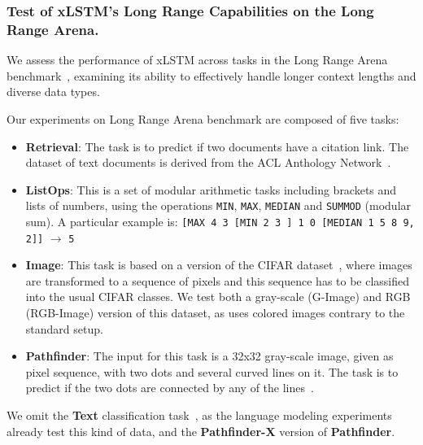 \documentclass[dvipsnames]{article}
\begin{document}
\begin{appendix}
\newpage

\subsubsection{Test of xLSTM's Long Range Capabilities on the Long Range Arena.}\label{sec:appExpSynthetic-lra}
We assess the performance of xLSTM across tasks in the Long Range Arena
benchmark~\citep{Tay:21}, examining its ability to effectively handle
longer context lengths and diverse data types.

Our experiments on Long Range Arena benchmark are composed of five tasks:
\begin{itemize}
\item \textbf{Retrieval}: The task is to predict if two documents have a citation link. 
The dataset of text documents is derived from the ACL Anthology Network~\citep{Radev:09}.
\item \textbf{ListOps}: This is a set of modular arithmetic tasks including brackets and lists of numbers, using the operations \texttt{MIN}, \texttt{MAX}, \texttt{MEDIAN} and \texttt{SUMMOD} (modular sum).
A particular example is: \texttt{[MAX 4 3 [MIN 2 3 ] 1 0 [MEDIAN 1 5 8 9, 2]]} $\xrightarrow{}$ \texttt{5}
\item \textbf{Image}: This task is based on a version of the CIFAR dataset~\citep{Krizhevsky:09}, 
where images are transformed to a sequence of pixels and this sequence has to be classified into the usual CIFAR classes. 
We test both a gray-scale (G-Image) and RGB (RGB-Image) version of this dataset, 
as \citet{Orvieto:23} uses colored images contrary to the standard setup.
\item \textbf{Pathfinder}: The input for this task is a 32x32 gray-scale image, given as pixel sequence,
with two dots and several curved lines on it. 
The task is to predict if the two dots are connected by any of the lines~\citep{Linsley:18}.
\end{itemize}
We omit the \textbf{Text} classification task~\citep{Maas:11}, 
as the language modeling experiments already test this kind of data, 
and the \textbf{Pathfinder-X} version of \textbf{Pathfinder}.



\end{appendix}
\end{document}

